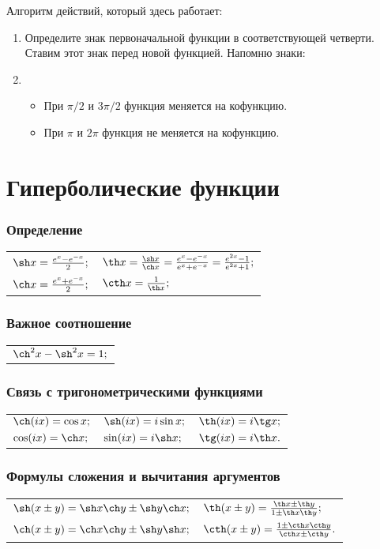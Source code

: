 \normalsize
Алгоритм действий, который здесь работает:
\begin{enumerate}
\item
Определите знак первоначальной функции в соответствующей четверти. Ставим этот знак перед новой функцией. Напомню знаки:
\item
\begin{itemize}
\item 
При $\pi/2$ и $3\pi/2$ функция меняется на кофункцию.
\item
При $\pi$ и $2\pi$ функция не меняется на кофункцию.
\end{itemize}
\end{enumerate}

\section{Гиперболические функции}

\subsubsection{Определение}
\begin{longtable}[l]{l l}
$\sh x = \frac{e^{x}-e^{-x}}{2};$
&
$\th x = \frac{\sh x}{\ch x}=\frac{e^{x}-e^{-x}}{e^{x}+e^{-x}}=\frac{e^{2x}-1}{e^{2x}+1};$
\\
$\ch x = \frac{e^{x}+e^{-x}}{2};$
&
$\cth x = \frac{1}{\th x};$
\end{longtable}

\subsubsection{Важное соотношение}
\begin{longtable}[l]{l}
$\ch^2 x - \sh^2 x = 1;$
\end{longtable}

\subsubsection{Связь с тригонометрическими функциями}
\begin{longtable}[l]{l l l}
$\ch (ix) = \cos x;$
&
$\sh (ix)= i \sin x;$
&
$\th (ix) = i \tg x;$
\\
$\cos (ix) = \ch x;$
&
$\sin (ix) = i \sh x;$
&
$\tg (ix) = i \th x.$
\end{longtable}

\subsubsection{Формулы сложения и вычитания аргументов}
\begin{longtable}[l]{l l}
$\sh (x\pm y) =  \sh x \ch y \pm \sh y \ch x;$
&
$\th (x \pm y) = \frac{\th x \pm \th y}{1 \pm \th x \th y};$
\\
$\ch (x\pm y) =  \ch x \ch y \pm \sh y \sh x;$
&
$\cth (x \pm y) = \frac{1 \pm \cth x \cth y}{\cth x \pm \cth y}.$
\end{longtable}


